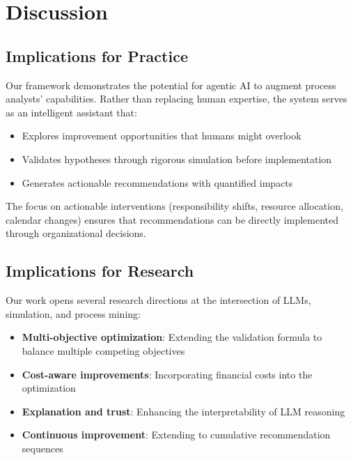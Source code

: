 \documentclass[preprint,12pt]{elsarticle}
\begin{document}
\section{Discussion}
\label{sec:discussion}

\subsection{Implications for Practice}

Our framework demonstrates the potential for agentic AI to augment process analysts' capabilities. Rather than replacing human expertise, the system serves as an intelligent assistant that:
\begin{itemize}
    \item Explores improvement opportunities that humans might overlook
    \item Validates hypotheses through rigorous simulation before implementation
    \item Generates actionable recommendations with quantified impacts
\end{itemize}

The focus on actionable interventions (responsibility shifts, resource allocation, calendar changes) ensures that recommendations can be directly implemented through organizational decisions.

\subsection{Implications for Research}

Our work opens several research directions at the intersection of LLMs, simulation, and process mining:
\begin{itemize}
    \item \textbf{Multi-objective optimization}: Extending the validation formula to balance multiple competing objectives
    \item \textbf{Cost-aware improvements}: Incorporating financial costs into the optimization
    \item \textbf{Explanation and trust}: Enhancing the interpretability of LLM reasoning
    \item \textbf{Continuous improvement}: Extending to cumulative recommendation sequences
\end{itemize}
\end{document}
